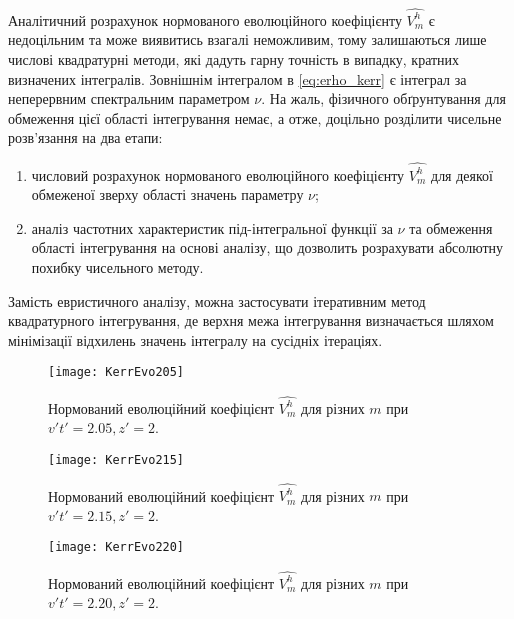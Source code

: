 Аналітичний розрахунок нормованого еволюційного коефіцієнту $ \hat{V_m^h} $
є недоцільним та може виявитись взагалі неможливим, тому залишаються лише
числові квадратурні методи, які дадуть гарну точність в випадку,
кратних визначених інтегралів. Зовнішнім інтегралом в \eqref{eq:erho_kerr} є 
інтеграл за неперервним спектральним параметром $ \nu $. На жаль, фізичного
обґрунтування для обмеження цієї області інтегрування немає, а отже,
доцільно розділити чисельне розв'язання на два етапи:

\begin{enumerate}
	\item числовий розрахунок нормованого еволюційного коефіцієнту 
	$ \hat{V_m^h} $ для деякої обмеженої зверху області значень 
	параметру $ \nu $;
	\item аналіз частотних характеристик під-інтегральної функції за 
	$ \nu $ та обмеження області інтегрування на основі аналізу, що 
	дозволить розрахувати абсолютну похибку чисельного методу.
\end{enumerate}

Замість евристичного аналізу, можна застосувати ітеративним метод 
квадратурного інтегрування, де верхня межа інтегрування визначається 
шляхом мінімізації відхилень значень інтегралу на сусідніх ітераціях.

\begin{figure}[htbp] \begin{center}
\texttt{[image: KerrEvo205]}
\caption{Нормований еволюційний коефіцієнт $ \hat{V_m^h} $ для 
різних $ m $ при $ v't' = 2.05, z' = 2 $.} 
\label{fig:KerrEvo205}
\end{center} \end{figure}

\begin{figure}[htbp] \begin{center}
\texttt{[image: KerrEvo215]}
\caption{Нормований еволюційний коефіцієнт $ \hat{V_m^h} $ для 
різних $ m $ при $ v't' = 2.15, z' = 2 $.} 
\label{fig:KerrEvo215}
\end{center} \end{figure}

\begin{figure}[htbp] \begin{center}
\texttt{[image: KerrEvo220]}
\caption{Нормований еволюційний коефіцієнт $ \hat{V_m^h} $ для 
різних $ m $ при $ v't' = 2.20, z' = 2 $.} 
\label{fig:KerrEvo220}
\end{center} \end{figure}

